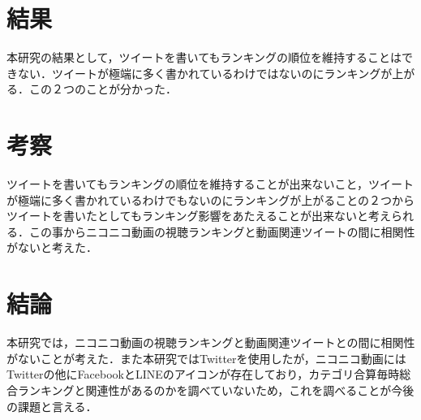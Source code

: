 \documentclass[uplatex,twocolumn,dvipdfmx]{jsarticle}
\begin{document}
\section{結果}
本研究の結果として，ツイートを書いてもランキングの順位を維持することはできない．ツイートが極端に多く書かれているわけではないのにランキングが上がる．この２つのことが分かった．
\section{考察}
ツイートを書いてもランキングの順位を維持することが出来ないこと，ツイートが極端に多く書かれているわけでもないのにランキングが上がることの２つからツイートを書いたとしてもランキング影響をあたえることが出来ないと考えられる．この事からニコニコ動画の視聴ランキングと動画関連ツイートの間に相関性がないと考えた．
\section{結論}
本研究では，ニコニコ動画の視聴ランキングと動画関連ツイートとの間に相関性がないことが考えた．また本研究ではTwitterを使用したが，ニコニコ動画にはTwitterの他にFacebookとLINEのアイコンが存在しており，カテゴリ合算毎時総合ランキングと関連性があるのかを調べていないため，これを調べることが今後の課題と言える．



\end{document}
